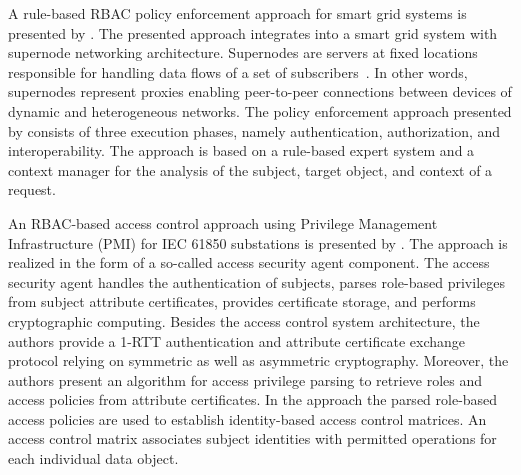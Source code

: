 A rule-based RBAC policy enforcement approach for smart grid systems is presented by \citeauthor{Alcaraz2016} \cite{Alcaraz2016}.
The presented approach integrates into a smart grid system with supernode networking architecture.
Supernodes are servers at fixed locations responsible for handling data flows of a set of subscribers~\cite{Samuel2008}.
In other words, supernodes represent proxies enabling peer-to-peer connections between devices of dynamic and heterogeneous networks.
The policy enforcement approach presented by \citeauthor{Alcaraz2016} consists of three execution phases, namely authentication, authorization, and interoperability.
The approach is based on a rule-based expert system and a context manager for the analysis of the subject, target object, and context of a request.

An RBAC-based access control approach using Privilege Management Infrastructure (PMI) for IEC 61850 substations is presented by \citeauthor{Liu2006} \cite{Liu2006}.
The approach is realized in the form of a so-called access security agent component.
The access security agent handles the authentication of subjects, parses role-based privileges from subject attribute certificates, provides certificate storage, and performs cryptographic computing.
Besides the access control system architecture, the authors provide a 1-RTT authentication and attribute certificate exchange protocol relying on symmetric as well as asymmetric cryptography.
Moreover, the authors present an algorithm for access privilege parsing to retrieve roles and access policies from attribute certificates.
In the approach the parsed role-based access policies are used to establish identity-based access control matrices.
An access control matrix associates subject identities with permitted operations for each individual data object.
